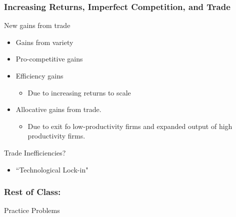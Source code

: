\documentclass{beamer}
\begin{document}
\begin{frame}
	\frametitle{Increasing Returns, Imperfect Competition, and Trade}
New gains from trade
	\begin{itemize}
		\item Gains from variety
		\item Pro-competitive gains
		\item Efficiency gains
			\begin{itemize}
				\item Due to increasing returns to scale
			\end{itemize} 
		\item Allocative gains from trade.
			\begin{itemize}
				\item Due to exit fo low-productivity firms and expanded output of high productivity firms.
			\end{itemize}
	\end{itemize}
Trade Inefficiencies?
	\begin{itemize}
		\item ``Technological Lock-in"
	\end{itemize}
\end{frame}

\begin{frame}
	\frametitle{Rest of Class:}
	
Practice Problems
\end{frame}
\end{document}
